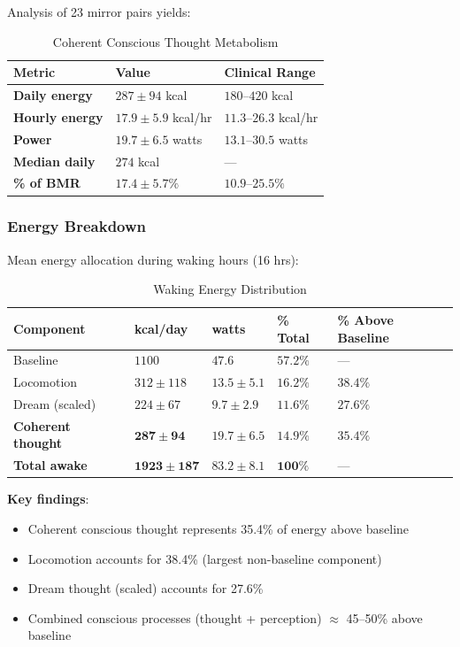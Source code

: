 \documentclass[12pt]{article}
\theoremstyle{remark}
\begin{document}
Analysis of 23 mirror pairs yields:

\begin{table}[H]
\centering
\caption{Coherent Conscious Thought Metabolism}
\begin{tabular}{@{}lll@{}}
\toprule
\textbf{Metric} & \textbf{Value} & \textbf{Clinical Range} \\
\midrule
\textbf{Daily energy} & $287 \pm 94$ kcal & $180$--$420$ kcal \\
\textbf{Hourly energy} & $17.9 \pm 5.9$ kcal/hr & $11.3$--$26.3$ kcal/hr \\
\textbf{Power} & $19.7 \pm 6.5$ watts & $13.1$--$30.5$ watts \\
\textbf{Median daily} & $274$ kcal & --- \\
\textbf{\% of BMR} & $17.4 \pm 5.7\%$ & $10.9$--$25.5\%$ \\
\bottomrule
\end{tabular}
\end{table}

\subsubsection{Energy Breakdown}

Mean energy allocation during waking hours (16 hrs):

\begin{table}[H]
\centering
\caption{Waking Energy Distribution}
\begin{tabular}{@{}lllll@{}}
\toprule
\textbf{Component} & \textbf{kcal/day} & \textbf{watts} & \textbf{\% Total} & \textbf{\% Above Baseline} \\
\midrule
Baseline & $1100$ & $47.6$ & $57.2\%$ & --- \\
Locomotion & $312 \pm 118$ & $13.5 \pm 5.1$ & $16.2\%$ & $38.4\%$ \\
Dream (scaled) & $224 \pm 67$ & $9.7 \pm 2.9$ & $11.6\%$ & $27.6\%$ \\
\textbf{Coherent thought} & $\mathbf{287 \pm 94}$ & $\mathbf{19.7 \pm 6.5}$ & $\mathbf{14.9\%}$ & $\mathbf{35.4\%}$ \\
\midrule
\textbf{Total awake} & $\mathbf{1923 \pm 187}$ & $\mathbf{83.2 \pm 8.1}$ & $\mathbf{100\%}$ & --- \\
\bottomrule
\end{tabular}
\end{table}

\textbf{Key findings}:
\begin{itemize}
\item Coherent conscious thought represents 35.4\% of energy above baseline
\item Locomotion accounts for 38.4\% (largest non-baseline component)
\item Dream thought (scaled) accounts for 27.6\%
\item Combined conscious processes (thought + perception) $\approx$ 45--50\% above baseline
\end{itemize}
\end{document}
